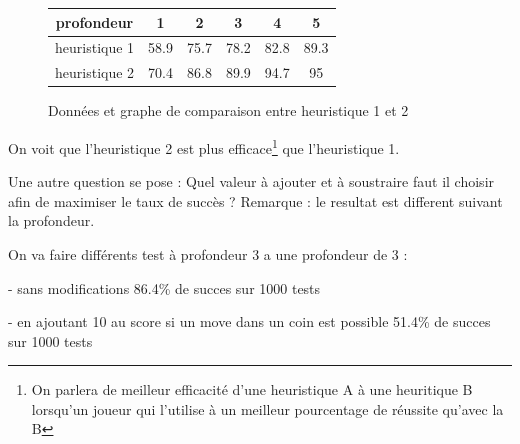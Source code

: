 \documentclass{report}
\begin{document}
\begin{figure}[!h]
\begin{center}
\renewcommand{\arraystretch} {1.5}
    \begin{tabular}{c|c|c|c|c|c|}
        profondeur & 1 & 2 & 3 & 4 & 5\\
        \hline
        heuristique 1 & 58.9 & 75.7 & 78.2 & 82.8 & 89.3\\
        \hline
        heuristique 2 & 70.4 & 86.8 & 89.9 & 94.7 & 95\\
        \hline
    \end{tabular}
\end{center}
\begin{center}
\caption{Données et graphe de comparaison entre heuristique 1 et 2}
\end{center}

\end{figure}

On voit que l'heuristique 2 est plus efficace\footnote{On parlera de meilleur efficacité d'une heuristique A à une heuritique B lorsqu'un  joueur qui l'utilise à un meilleur pourcentage de réussite qu'avec la B}  que l'heuristique 1.\newline

Une autre question se pose : Quel valeur à ajouter et à soustraire faut il choisir afin de maximiser le taux de succès ?
Remarque : le resultat est different suivant la profondeur.

On va faire différents test à profondeur 3
a une profondeur de 3 :

- sans modifications
86.4\% de succes sur 1000 tests

- en ajoutant 10 au score si un move dans un coin est possible
51.4\% de succes sur 1000 tests
\end{document}
